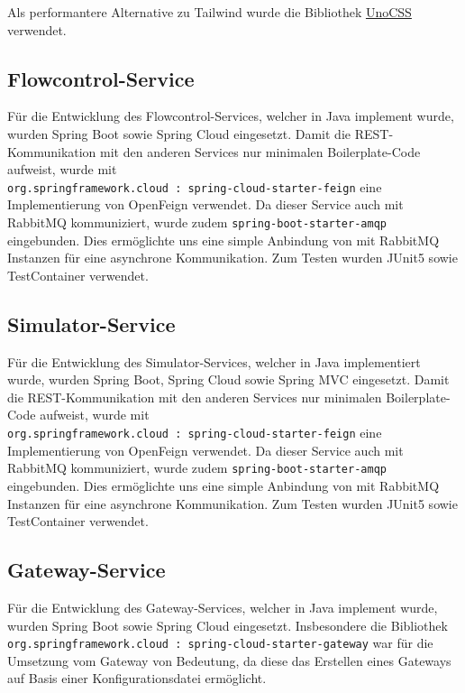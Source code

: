 Als performantere Alternative zu Tailwind wurde die Bibliothek \href{https://uno.antfu.me}{UnoCSS} verwendet.

\subsection{Flowcontrol-Service}

Für die Entwicklung des Flowcontrol-Services, welcher in Java implement wurde, wurden Spring Boot sowie Spring Cloud eingesetzt.
Damit die REST-Kommunikation mit den anderen Services nur minimalen Boilerplate-Code aufweist, wurde mit \\ \verb|org.springframework.cloud : spring-cloud-starter-feign| eine Implementierung von OpenFeign verwendet.
Da dieser Service auch mit RabbitMQ kommuniziert, wurde zudem \verb|spring-boot-starter-amqp| eingebunden.
Dies ermöglichte uns eine simple Anbindung von mit RabbitMQ Instanzen für eine asynchrone Kommunikation.
Zum Testen wurden JUnit5 sowie TestContainer verwendet.

\subsection{Simulator-Service}

Für die Entwicklung des Simulator-Services, welcher in Java implementiert wurde, wurden Spring Boot, Spring Cloud sowie Spring MVC eingesetzt.
Damit die REST-Kommunikation mit den anderen Services nur minimalen Boilerplate-Code aufweist, wurde mit \\ \verb|org.springframework.cloud : spring-cloud-starter-feign| eine Implementierung von OpenFeign verwendet.
Da dieser Service auch mit RabbitMQ kommuniziert, wurde zudem \verb|spring-boot-starter-amqp| eingebunden.
Dies ermöglichte uns eine simple Anbindung von mit RabbitMQ Instanzen für eine asynchrone Kommunikation.
Zum Testen wurden JUnit5 sowie TestContainer verwendet.

\subsection{Gateway-Service}

Für die Entwicklung des Gateway-Services, welcher in Java implement wurde, wurden Spring Boot sowie Spring Cloud eingesetzt.
Insbesondere die Bibliothek \verb|org.springframework.cloud : spring-cloud-starter-gateway| war für die Umsetzung vom Gateway von Bedeutung, da diese das Erstellen eines Gateways auf Basis einer Konfigurationsdatei ermöglicht.
